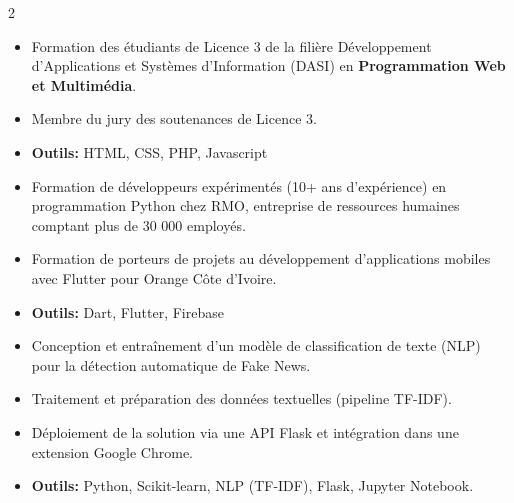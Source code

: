 \documentclass[10pt,a4paper,ragged2e,withhyper]{altacv}
\begin{document}
\begin{paracol}{2}
            \begin{itemize}
                \item Formation des étudiants de Licence 3 de la filière Développement d'Applications et Systèmes d'Information (DASI) en {\textbf{Programmation Web et Multimédia}}.
                \item Membre du jury des soutenances de Licence 3.
                \item \textcolor{SecondaryColor}{\textbf{Outils: }} HTML, CSS, PHP, Javascript
            \end{itemize}
            \divider

            \begin{itemize}
                \item Formation de développeurs expérimentés (10+ ans d'expérience) en programmation Python chez RMO, entreprise de ressources humaines comptant plus de 30 000 employés.
            \end{itemize}
            \divider

            

            \begin{itemize}
                \item Formation de porteurs de projets au développement d'applications mobiles avec Flutter pour Orange Côte d'Ivoire.
                \item \textcolor{SecondaryColor}{\textbf{Outils: }} Dart, Flutter, Firebase
            \end{itemize}
            
            \newpage

        \divider

        \begin{itemize}
            \item Conception et entraînement d'un modèle de classification de texte (NLP) pour la détection automatique de Fake News.
            \item Traitement et préparation des données textuelles (pipeline TF-IDF).
            \item Déploiement de la solution via une API Flask et intégration dans une extension Google Chrome.
            \item \textcolor{SecondaryColor}{\textbf{Outils: }} Python, Scikit-learn, NLP (TF-IDF), Flask, Jupyter Notebook.
        \end{itemize}


\end{paracol}
\end{document}
